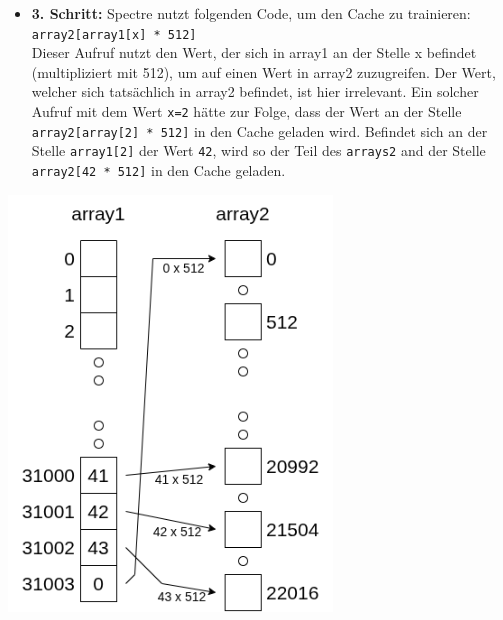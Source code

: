 \noindent
\begin{minipage}{0.58\textwidth}
	\begin{itemize}
		\item \textbf{3. Schritt:} Spectre nutzt folgenden Code, um den Cache zu trainieren: \\
		      \label{itm:step3_code}
		      \texttt{array2[array1[x] * 512]} \\
		      Dieser Aufruf nutzt den Wert, der sich in array1 an der Stelle x befindet (multipliziert mit 512), um auf einen Wert in array2 zuzugreifen.
		      Der Wert, welcher sich tatsächlich in array2 befindet, ist hier irrelevant.
		      Ein solcher Aufruf mit dem Wert \texttt{x=2} hätte zur Folge, dass der Wert an der Stelle \texttt{array2[array[2] * 512]} in den Cache geladen wird.
		      Befindet sich an der Stelle \texttt{array1[2]} der Wert \texttt{42}, wird so der Teil des \texttt{arrays2} and der Stelle \texttt{array2[42 * 512]} in den Cache geladen.
	\end{itemize}
\end{minipage}
\hfill
\begin{minipage}{0.4\textwidth}
	\centering
	\includegraphics[width=\linewidth]{Attack-2}
\end{minipage}



